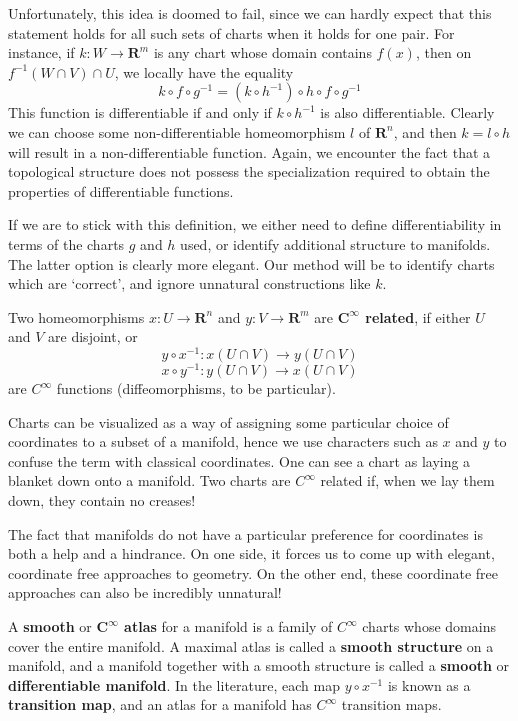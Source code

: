 Unfortunately, this idea is doomed to fail, since we can hardly expect that this statement holds for all such sets of charts when it holds for one pair. For instance, if $k:W \to \mathbf{R}^m$ is any chart whose domain contains $f(x)$, then on $f^{-1}(W \cap V)  \cap U$, we locally have the equality
%
\[ k \circ f \circ g^{-1} = (k \circ h^{-1}) \circ h \circ f \circ g^{-1} \]
%
This function is differentiable if and only if $k \circ h^{-1}$ is also differentiable. Clearly we can choose some non-differentiable homeomorphism $l$ of $\mathbf{R}^n$, and then $k = l \circ h$ will result in a non-differentiable function. Again, we encounter the fact that a topological structure does not possess the specialization required to obtain the properties of differentiable functions.

If we are to stick with this definition, we either need to define differentiability in terms of the charts $g$ and $h$ used, or identify additional structure to manifolds. The latter option is clearly more elegant. Our method will be to identify charts which are `correct', and ignore unnatural constructions like $k$.

\begin{definition}
    Two homeomorphisms $x:U \to \mathbf{R}^n$ and $y:V \to \mathbf{R}^m$ are {\bf $\mathbf{C^\infty}$ related}, if either $U$ and $V$ are disjoint, or
    \[ y \circ x^{-1} : x(U \cap V) \to y(U \cap V) \]
    \[ x \circ y^{-1} : y(U \cap V) \to x(U \cap V) \]
    are $C^\infty$ functions (diffeomorphisms, to be particular).
\end{definition}

Charts can be visualized as a way of assigning some particular choice of coordinates to a subset of a manifold, hence we use characters such as $x$ and $y$ to confuse the term with classical coordinates. One can see a chart as laying a blanket down onto a manifold. Two charts are $C^\infty$ related if, when we lay them down, they contain no creases!

The fact that manifolds do not have a particular preference for coordinates is both a help and a hindrance. On one side, it forces us to come up with elegant, coordinate free approaches to geometry. On the other end, these coordinate free approaches can also be incredibly unnatural!

\begin{definition}
    A {\bf smooth} or {\bf $\mathbf{C^\infty}$ atlas} for a manifold is a family of $C^\infty$ charts whose domains cover the entire manifold. A maximal atlas is called a {\bf smooth structure} on a manifold, and a manifold together with a smooth structure is called a {\bf smooth} or {\bf differentiable manifold}. In the literature, each map $y \circ x^{-1}$ is known as a {\bf transition map}, and an atlas for a manifold has $C^\infty$ transition maps.
\end{definition}

